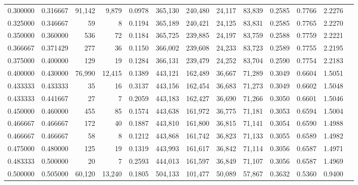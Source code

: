 \begin{tabular}{rrrrrrrrrrrrr}
0.300000 & 0.316667 & 91,142 &  9,879 &                                     0.0978 & 365,130 & 240,480 &  24,117 &  83,839 & 0.2585 & 0.7766 & 2.2276 \\
0.325000 & 0.346667 &     59 &      8 &                                     0.1194 & 365,189 & 240,421 &  24,125 &  83,831 & 0.2585 & 0.7765 & 2.2270 \\
0.350000 & 0.360000 &    536 &     72 &                                     0.1184 & 365,725 & 239,885 &  24,197 &  83,759 & 0.2588 & 0.7759 & 2.2221 \\
0.366667 & 0.371429 &    277 &     36 &                                     0.1150 & 366,002 & 239,608 &  24,233 &  83,723 & 0.2589 & 0.7755 & 2.2195 \\
0.375000 & 0.400000 &    129 &     19 &                                     0.1284 & 366,131 & 239,479 &  24,252 &  83,704 & 0.2590 & 0.7754 & 2.2183 \\
0.400000 & 0.430000 & 76,990 & 12,415 &                                     0.1389 & 443,121 & 162,489 &  36,667 &  71,289 & 0.3049 & 0.6604 & 1.5051 \\
0.433333 & 0.433333 &     35 &     16 &                                     0.3137 & 443,156 & 162,454 &  36,683 &  71,273 & 0.3049 & 0.6602 & 1.5048 \\
0.433333 & 0.441667 &     27 &      7 &                                     0.2059 & 443,183 & 162,427 &  36,690 &  71,266 & 0.3050 & 0.6601 & 1.5046 \\
0.450000 & 0.460000 &    455 &     85 &                                     0.1574 & 443,638 & 161,972 &  36,775 &  71,181 & 0.3053 & 0.6594 & 1.5004 \\
0.466667 & 0.466667 &    172 &     40 &                                     0.1887 & 443,810 & 161,800 &  36,815 &  71,141 & 0.3054 & 0.6590 & 1.4988 \\
0.466667 & 0.466667 &     58 &      8 &                                     0.1212 & 443,868 & 161,742 &  36,823 &  71,133 & 0.3055 & 0.6589 & 1.4982 \\
0.475000 & 0.480000 &    125 &     19 &                                     0.1319 & 443,993 & 161,617 &  36,842 &  71,114 & 0.3056 & 0.6587 & 1.4971 \\
0.483333 & 0.500000 &     20 &      7 &                                     0.2593 & 444,013 & 161,597 &  36,849 &  71,107 & 0.3056 & 0.6587 & 1.4969 \\
0.500000 & 0.505000 & 60,120 & 13,240 &                                     0.1805 & 504,133 & 101,477 &  50,089 &  57,867 & 0.3632 & 0.5360 & 0.9400 \\

\end{tabular}
